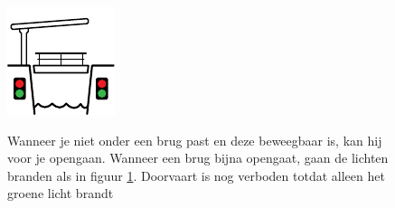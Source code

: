 \begin{figure}[H]
	\centering
	\begin{minipage}[b]{0.18\textwidth}
		\includegraphics[width=\textwidth]{Hoofdstukken/Bruggen/pdf/brug_aanstonds_toegestaan.pdf}
		\caption{}
		\label{pic:brug:aanstonds}
	\end{minipage}
	\hfill
	\begin{minipage}[t]{0.75\textwidth}
		\vspace{-2.5cm}
		Wanneer je niet onder een brug past en deze beweegbaar is, kan hij voor je opengaan. Wanneer een brug bijna opengaat, gaan de lichten branden als in figuur \ref{pic:brug:aanstonds}. Doorvaart is nog verboden totdat alleen het groene licht brandt
	\end{minipage}
\end{figure}
\vspace{-0.75cm}
